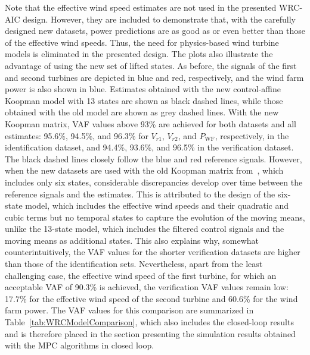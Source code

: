 Note that the effective wind speed estimates are not used in the presented WRC-AIC design. However, they are included to demonstrate that, with the carefully designed new datasets, power predictions are as good as or even better than those of the effective wind speeds. Thus, the need for physics-based wind turbine models is eliminated in the presented design. The plots also illustrate the advantage of using the new set of lifted states. As before, the signals of the first and second turbines are depicted in blue and red, respectively, and the wind farm power is also shown in blue. Estimates obtained with the new control-affine Koopman model with 13 states are shown as black dashed lines, while those obtained with the old model are shown as grey dashed lines. With the new Koopman matrix, VAF values above 93\% are achieved for both datasets and all estimates: 95.6\%, 94.5\%, and 96.3\% for $V_{r1}$, $V_{r2}$, and $P_{\text{WF}}$, respectively, in the identification dataset, and 94.4\%, 93.6\%, and 96.5\% in the verification dataset. The black dashed lines closely follow the blue and red reference signals. However, when the new datasets are used with the old Koopman matrix from~\cite{dittmer2023koopman}, which includes only six states, considerable discrepancies develop over time between the reference signals and the estimates. This is attributed to the design of the six-state model, which includes the effective wind speeds and their quadratic and cubic terms but no temporal states to capture the evolution of the moving means, unlike the 13-state model, which includes the filtered control signals and the moving means as additional states. This also explains why, somewhat counterintuitively, the VAF values for the shorter verification datasets are higher than those of the identification sets. Nevertheless, apart from the least challenging case, the effective wind speed of the first turbine, for which an acceptable VAF of 90.3\% is achieved, the verification VAF values remain low: 17.7\% for the effective wind speed of the second turbine and 60.6\% for the wind farm power. The VAF values for this comparison are summarized in Table~\ref{tab:WRCModelComparison}, which also includes the closed-loop results and is therefore placed in the section presenting the simulation results obtained with the MPC algorithms in closed loop.

